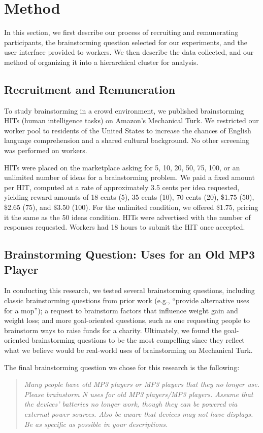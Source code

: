 \section{Method}
In this section, we first describe our process of recruiting and remunerating participants, the brainstorming question selected for our experiments, and the user interface provided to workers. We then describe the data collected, and our method of organizing it into a hierarchical cluster for analysis.

\subsection{Recruitment and Remuneration}
To study brainstorming in a crowd environment, we published brainstorming HITs (human intelligence tasks) on Amazon's Mechanical Turk. We restricted our worker pool to residents of the United States to increase the chances of English language comprehension and a shared cultural background. No other screening was performed on workers.

HITs were placed on the marketplace asking for 5, 10, 20, 50, 75, 100, or an unlimited number of ideas for a brainstorming problem. We paid a fixed amount per HIT, computed at a rate of approximately 3.5 cents per idea requested, yielding reward amounts of 18 cents (5), 35 cents (10), 70 cents (20), \$1.75 (50), \$2.65 (75), and \$3.50 (100). For the unlimited condition, we offered \$1.75, pricing it the same as the 50 ideas condition. HITs were advertised with the number of responses requested. Workers had 18 hours to submit the HIT once accepted.

\subsection{Brainstorming Question: Uses for an Old MP3 Player}
In conducting this research, we tested several brainstorming questions, including classic brainstorming questions from prior work (e.g., ``provide alternative uses for a mop''); a request to brainstorm factors that influence weight gain and weight loss; and more goal-oriented questions, such as one requesting people to brainstorm ways to raise funds for a charity. Ultimately, we found the goal-oriented brainstorming questions to be the most compelling since they reflect what we believe would be real-world uses of brainstorming on Mechanical Turk.

The final brainstorming question we chose for this research is the following:
\begin{quote}
{\em Many people have old MP3 players or MP3 players that they no longer use. Please brainstorm N uses for old MP3 players/MP3 players. Assume that the devices' batteries no longer work, though they can be powered via external power sources. Also be aware that devices may {\em not \/} have displays. Be as specific as possible in your descriptions.\/}
\end{quote}


